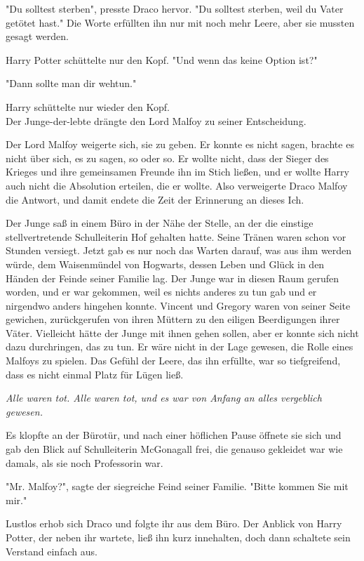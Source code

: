 {"Du solltest sterben", presste Draco hervor. "Du solltest sterben, weil du Vater getötet hast." Die Worte erfüllten ihn nur mit noch mehr Leere, aber sie mussten gesagt werden.

Harry Potter schüttelte nur den Kopf. "Und wenn das keine Option ist?"

"Dann sollte man dir wehtun."

Harry schüttelte nur wieder den Kopf.\\ Der Junge-der-lebte drängte den Lord Malfoy zu seiner Entscheidung.

Der Lord Malfoy weigerte sich, sie zu geben. Er konnte es nicht sagen, brachte es nicht über sich, es zu sagen, so oder so. Er wollte nicht, dass der Sieger des Krieges und ihre gemeinsamen Freunde ihn im Stich ließen, und er wollte Harry auch nicht die Absolution erteilen, die er wollte. Also verweigerte Draco Malfoy die Antwort, und damit endete die Zeit der Erinnerung an dieses Ich.

Der Junge saß in einem Büro in der Nähe der Stelle, an der die einstige stellvertretende Schulleiterin Hof gehalten hatte. Seine Tränen waren schon vor Stunden versiegt. Jetzt gab es nur noch das Warten darauf, was aus ihm werden würde, dem Waisenmündel von Hogwarts, dessen Leben und Glück in den Händen der Feinde seiner Familie lag. Der Junge war in diesen Raum gerufen worden, und er war gekommen, weil es nichts anderes zu tun gab und er nirgendwo anders hingehen konnte. Vincent und Gregory waren von seiner Seite gewichen, zurückgerufen von ihren Müttern zu den eiligen Beerdigungen ihrer Väter. Vielleicht hätte der Junge mit ihnen gehen sollen, aber er konnte sich nicht dazu durchringen, das zu tun. Er wäre nicht in der Lage gewesen, die Rolle eines Malfoys zu spielen. Das Gefühl der Leere, das ihn erfüllte, war so tiefgreifend, dass es nicht einmal Platz für Lügen ließ.

\emph{Alle waren tot. Alle waren tot, und es war von Anfang an alles vergeblich gewesen.}

Es klopfte an der Bürotür, und nach einer höflichen Pause öffnete sie sich und gab den Blick auf Schulleiterin McGonagall frei, die genauso gekleidet war wie damals, als sie noch Professorin war.

"Mr. Malfoy?", sagte der siegreiche Feind seiner Familie. "Bitte kommen Sie mit mir."

Lustlos erhob sich Draco und folgte ihr aus dem Büro. Der Anblick von Harry Potter, der neben ihr wartete, ließ ihn kurz innehalten, doch dann schaltete sein Verstand einfach aus.

}
